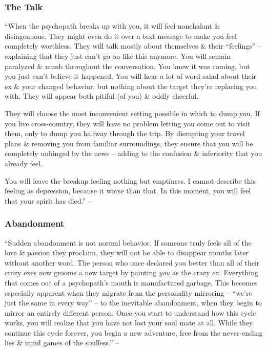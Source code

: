 \documentclass{article}
\numberwithin{equation}{section}
\begin{document}
\subsubsection{The Talk}
``When the psychopath breaks up with you, it will feel nonchalant \& disingenuous. They might even do it over a text message to make you feel completely worthless. They will talk mostly about themselves \& their ``feelings'' -- explaining that they just can't go on like this anymore. You will remain paralyzed \& numb throughout the conversation. You knew it was coming, but you just can't believe it happened. You will hear a lot of word salad about their ex \& your changed behavior, but nothing about the target they're replacing you with. They will appear both pitiful (of you) \& oddly cheerful.

They will choose the most inconvenient setting possible in which to dump you. If you live cross-country, they will have no problem letting you come out to visit them, only to dump you halfway through the trip. By disrupting your travel plans \& removing you from familiar surroundings, they ensure that you will be completely unhinged by the news -- adding to the confusion \& inferiority that you already feel.

You will leave the breakup feeling nothing but emptiness. I cannot describe this feeling as depression, because it worse than that. In this moment, you will feel that your spirit has died.'' -- \cite[p. 74]{MacKenzie2015}

\subsubsection{Abandonment}
``Sudden abandonment is not normal behavior. If someone truly feels all of the love \& passion they proclaim, they will not be able to disappear months later without another word. The person who once declared you better than all of their crazy exes now grooms a new target by painting \textit{you} as the crazy ex. Everything that comes out of a psychopath's mouth is manufactured garbage. This becomes especially apparent when they migrate from the personality mirroring -- ``we're just the same in every way'' -- to the inevitable abandonment, when they begin to mirror an entirely different person. Once you start to understand how this cycle works, you will realize that you have not lost your soul mate at all. While they continue this cycle forever, you begin a new adventure, free from the never-ending lies \& mind games of the soulless.'' -- \cite[p. 74]{MacKenzie2015}
\end{document}
